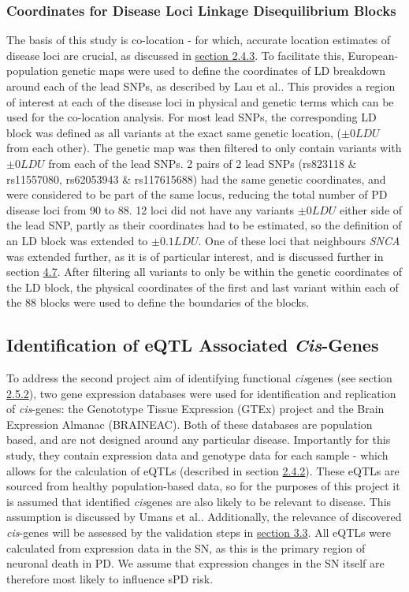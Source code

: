 \documentclass{article}
\begin{document}
\subsubsection{Coordinates for Disease Loci Linkage Disequilibrium Blocks}
\label{subsubsec:LDblock}
The basis of this study is co-location - for which, accurate location estimates of disease loci are crucial, as discussed in \hyperref[subsubsec:co-location]{section 2.4.3}. To facilitate this, European-population genetic maps were used to define the coordinates of LD breakdown around each of the lead SNPs, as described by Lau et al.\cite{Lau2017High-ResolutionEuropeans}. This provides a region of interest at each of the disease loci in physical and genetic terms which can be used for the co-location analysis. For most lead SNPs, the corresponding LD block was defined as all variants at the exact same genetic location, ($\pm0LDU$ from each other). The genetic map was then filtered to only contain variants with $\pm0LDU$ from each of the lead SNPs. 2 pairs of 2 lead SNPs (rs823118 \& rs11557080, rs62053943 \& rs117615688) had the same genetic coordinates, and were considered to be part of the same locus, reducing the total number of PD disease loci from 90 to 88. 12 loci did not have any variants $\pm0LDU$ either side of the lead SNP, partly as their coordinates had to be estimated, so the definition of an LD block was extended to $\pm0.1LDU$. One of these loci that neighbours \textit{SNCA} was extended further, as it is of particular interest, and is discussed further in section \hyperref[subsec:SNCA]{4.7}. After filtering all variants to only be within the genetic coordinates of the LD block, the physical coordinates of the first and last variant within each of the 88 blocks were used to define the boundaries of the blocks. 
\subsection{Identification of eQTL Associated \textit{Cis}-Genes}
\label{subsec:eQTL}
To address the second project aim of identifying functional \textit{cis}genes (see section \hyperref[subsubsec:Aims]{2.5.2}),  two gene expression databases were used for identification and replication of \textit{cis}-genes: the Genototype Tissue Expression (GTEx) project\cite{Lonsdale2013TheProject} and the Brain Expression Almanac (BRAINEAC)\cite{Ramasamy2014GeneticBrain}. Both of these databases are population based, and are not designed around any particular disease. Importantly for this study, they contain expression data and genotype data for each sample - which allows for the calculation of eQTLs (described in section \hyperref[subsubsec:QTL]{2.4.2}). These eQTLs are sourced from healthy population-based data, so for the purposes of this project it is assumed that identified \textit{cis}genes are also likely to be relevant to disease. This assumption is discussed by Umans et al.\cite{Umans2021WhereEQTLs}. Additionally, the relevance of discovered \textit{cis}-genes will be assessed by the validation steps in \hyperref[subsec:validation]{section 3.3}. All eQTLs were calculated from expression data in the SN, as this is the primary region of neuronal death in PD. We assume that expression changes in the SN itself are therefore most likely to influence sPD risk.
\end{document}

